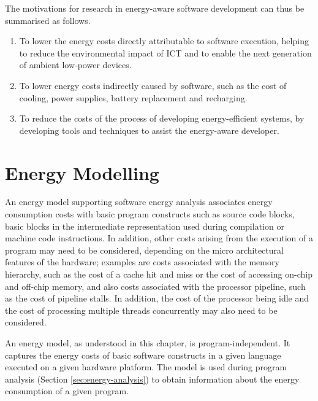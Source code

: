 \documentclass[oneside]{book}
\begin{document}
The motivations for research in energy-aware software development can thus be summarised as follows.
\begin{enumerate}
\item
To lower the energy costs directly attributable to software execution, helping to reduce the environmental impact of ICT and to enable the next generation of ambient low-power devices.
\item
To lower  energy costs indirectly caused by software, such as the cost of cooling, power supplies, battery replacement and recharging.
\item
To reduce the costs of the process of developing energy-efficient systems, by developing tools and techniques to assist the energy-aware developer.
\end{enumerate}

%
\nopagebreak
\section{Energy Modelling}\label{sec:energy-models}

%

An energy model supporting 
%
software energy analysis 
%
associates energy 
consumption costs
with 
basic
program constructs such as source code blocks, basic blocks in the intermediate representation 
%
used during compilation or machine code instructions.
%
In addition, other costs arising from the execution of a program may need to be considered, depending on the micro architectural features of the hardware; examples are costs associated with the memory hierarchy, such as the cost of a cache hit and miss or the cost of accessing on-chip and off-chip memory, and also costs associated with the processor pipeline, such as the cost of pipeline stalls. In addition, the cost of the processor being idle and the cost of processing multiple threads concurrently may also need to be considered. 

An energy model, as understood in this chapter, is program-independent.  It captures the energy costs of basic software constructs in a given language executed on a given hardware platform. The model is used during program analysis (Section \ref{sec:energy-analysis}) to obtain information about the energy consumption of a given program.
%
%
\end{document}
